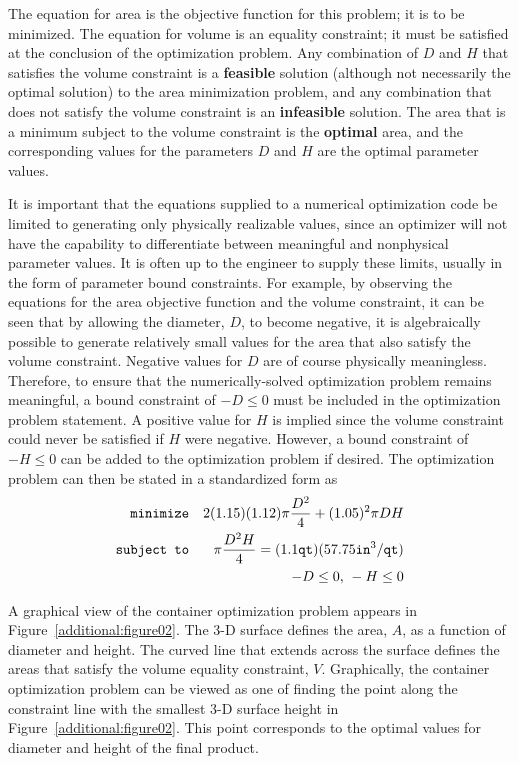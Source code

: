 The equation for area is the objective function for this problem; it
is to be minimized. The equation for volume is an equality constraint;
it must be satisfied at the conclusion of the optimization problem.
Any combination of $D$ and $H$ that satisfies the volume constraint is
a \textbf{feasible} solution (although not necessarily the optimal
solution) to the area minimization problem, and any combination that
does not satisfy the volume constraint is an \textbf{infeasible}
solution. The area that is a minimum subject to the volume constraint
is the \textbf{optimal} area, and the corresponding values for the
parameters $D$ and $H$ are the optimal parameter values.

It is important that the equations supplied to a numerical
optimization code be limited to generating only physically realizable
values, since an optimizer will not have the capability to
differentiate between meaningful and nonphysical parameter values. It
is often up to the engineer to supply these limits, usually in the
form of parameter bound constraints. For example, by observing the
equations for the area objective function and the volume constraint,
it can be seen that by allowing the diameter, $D$, to become negative,
it is algebraically possible to generate relatively small values for
the area that also satisfy the volume constraint. Negative values for
$D$ are of course physically meaningless. Therefore, to ensure that
the numerically-solved optimization problem remains meaningful, a
bound constraint of $-D \leq 0$ must be included in the optimization
problem statement. A positive value for $H$ is implied since the
volume constraint could never be satisfied if $H$ were negative.
However, a bound constraint of $-H \leq 0$ can be added to the
optimization problem if desired. The optimization problem can then be
stated in a standardized form as
\begin{eqnarray}
\texttt{minimize}   & & 2(1.15)(1.12)\pi\frac{D^2}{4}+(1.05)^2\pi DH\nonumber\\
\texttt{subject to} & & \pi\frac{D^2H}{4}=
  (1.1\mathtt{qt})(57.75 \mathtt{in}^3/\mathtt{qt}) \label{additional:contFH}\\
                    & & -D \leq 0\hbox{, }-H \leq 0\nonumber
\end{eqnarray}

A graphical view of the container optimization problem appears in
Figure~\ref{additional:figure02}. The 3-D surface defines the area,
$A$, as a function of diameter and height. The curved line that
extends across the surface defines the areas that satisfy the volume
equality constraint, $V$. Graphically, the container optimization
problem can be viewed as one of finding the point along the constraint
line with the smallest 3-D surface height in
Figure~\ref{additional:figure02}. This point corresponds to the
optimal values for diameter and height of the final product.

